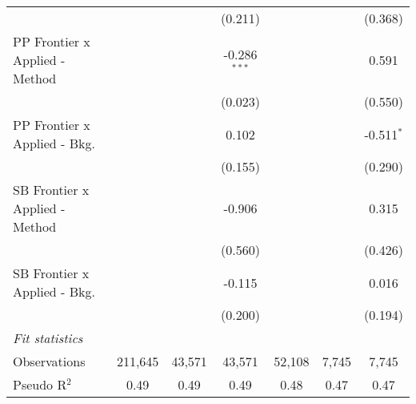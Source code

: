 \begin{tabular}{lcccccc}
                                  &                &              & (0.211)        &               &               & (0.368)\\   
   PP Frontier x Applied - Method &                &              & -0.286$^{***}$ &               &               & 0.591\\   
                                  &                &              & (0.023)        &               &               & (0.550)\\   
   PP Frontier x Applied - Bkg.   &                &              & 0.102          &               &               & -0.511$^{*}$\\   
                                  &                &              & (0.155)        &               &               & (0.290)\\   
   SB Frontier x Applied - Method &                &              & -0.906         &               &               & 0.315\\   
                                  &                &              & (0.560)        &               &               & (0.426)\\   
   SB Frontier x Applied - Bkg.   &                &              & -0.115         &               &               & 0.016\\   
                                  &                &              & (0.200)        &               &               & (0.194)\\   
   \midrule
   \emph{Fit statistics}\\
   Observations                   & 211,645        & 43,571       & 43,571         & 52,108        & 7,745         & 7,745\\  
   Pseudo R$^2$                   & 0.49           & 0.49         & 0.49           & 0.48          & 0.47          & 0.47\\  
   

\end{tabular}
